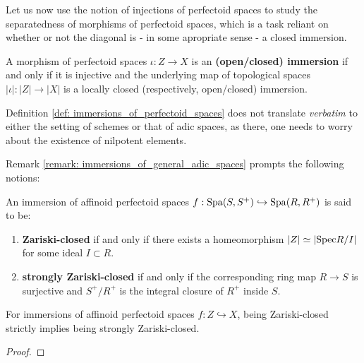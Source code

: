             Let us now use the notion of injections of perfectoid spaces to study the separatedness of morphisms of perfectoid spaces, which is a task reliant on whether or not the diagonal is - in some apropriate sense - a closed immersion. 
            \begin{definition} \label{def: immersions_of_perfectoid_spaces}
                A morphism of perfectoid spaces $\iota: Z \to X$ is an \textbf{(open/closed) immersion} if and only if it is injective and the underlying map of topological spaces $|\iota|: |Z| \to |X|$ is a locally closed (respectively, open/closed) immersion.
            \end{definition}
            \begin{remark} \label{remark: immersions_of_general_adic_spaces} 
                Definition \ref{def: immersions_of_perfectoid_spaces} does not translate \textit{verbatim} to either the setting of schemes or that of adic spaces, as there, one needs to worry about the existence of nilpotent elements. 
            \end{remark}
            Remark \ref{remark: immersions_of_general_adic_spaces} prompts the following notions:
            \begin{definition} \label{def: zariski_closed_morphisms}
                An immersion of affinoid perfectoid spaces $f: \mathrm{Spa}(S, S^+) \hookrightarrow \mathrm{Spa}(R, R^+)$ is said to be:
                    \begin{enumerate}
                        \item \textbf{Zariski-closed} if and only if there exists a homeomorphism $|Z| \simeq |\mathrm{Spec} R/I|$ for some ideal $I \subset R$.
                        \item \textbf{strongly Zariski-closed} if and only if the corresponding ring map $R \to S$ is surjective and $S^+/R^+$ is the integral closure of $R^+$ inside $S$.
                    \end{enumerate}
            \end{definition}
            \begin{proposition} \label{prop: zariski_closed_implies_strongly_zariski_closed}
                For immersions of affinoid perfectoid spaces $f: Z \hookrightarrow X$, being Zariski-closed strictly implies being strongly Zariski-closed.
            \end{proposition}
                \begin{proof}
                    
                \end{proof}
